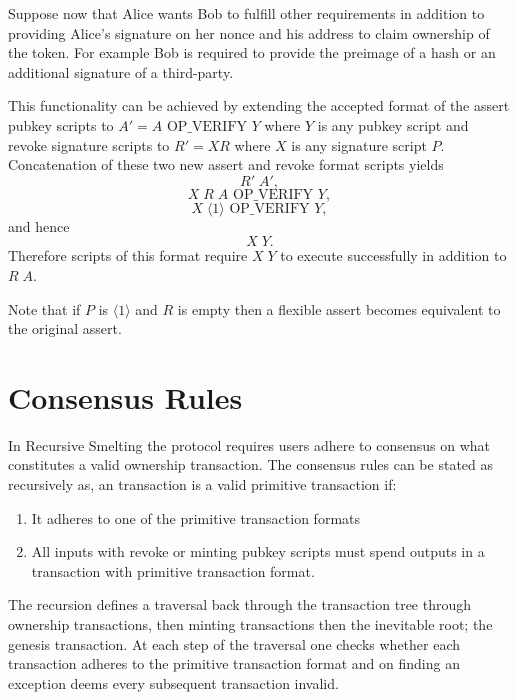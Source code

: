 \documentclass[9pt,oneside]{amsart}
\begin{document}
Suppose now that Alice wants Bob to fulfill other requirements in addition to providing Alice's signature on her nonce and his address to claim ownership of the token. For example Bob is required to provide the preimage of a hash or an additional signature of a third-party. 

This functionality can be achieved by extending the accepted format of the assert pubkey scripts to $A' = A \text{ OP\_VERIFY } Y$ where $Y$ is any pubkey script and revoke signature scripts to $R' = X R$ where $X$ is any signature script $P$. Concatenation of these two new assert and revoke format scripts yields
\[R' \; A',\]
\[X \; R \; A \text{ OP\_VERIFY } Y,\]
\[X \; \langle 1 \rangle \text{ OP\_VERIFY } Y,\]
and hence
\[X \; Y.\]
Therefore scripts of this format require $X \; Y$ to execute successfully in addition to $R \; A$. 

Note that if $P$ is $\langle 1 \rangle$ and $R$ is empty then a flexible assert becomes equivalent to the original assert.


\section{Consensus Rules}
In Recursive Smelting the protocol requires users adhere to consensus on what constitutes a valid ownership transaction. The consensus rules can be stated as recursively as, an  transaction is a valid primitive transaction if:
    \begin{enumerate}
        \item It adheres to one of the primitive transaction formats 
        \item All inputs with revoke or minting pubkey scripts must  spend outputs in a transaction with primitive transaction format.
    \end{enumerate}
    
The recursion defines a traversal back through the transaction tree through ownership transactions, then minting transactions then the inevitable root; the genesis transaction. At each step of the traversal one checks whether each transaction adheres to the primitive transaction format and on finding an exception deems every subsequent transaction invalid.
\end{document}
